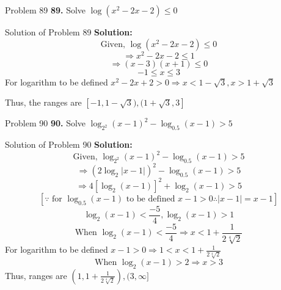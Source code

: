 \documentclass[aspectratio=169,8pt]{beamer}
\begin{document}
\begin{frame}{Problem 89}
  \textbf{89.} Solve $\log(x^2 - 2x - 2)\leq 0$
\end{frame}
\begin{frame}{Solution of Problem 89}
  \textbf{Solution:} $$\text{Given,~}\log(x^2 - 2x - 2)\leq 0$$
  $$\Rightarrow x^2 - 2x - 2 \leq 1$$
  $$\Rightarrow (x - 3)(x + 1)\leq 0$$
  $$-1 \leq x \leq 3$$
  For logarithm to be defined $x^2 - 2x + 2 > 0 \Rightarrow x < 1 - \sqrt{3}, x > 1 + \sqrt{3}$

  Thus, the ranges are $[-1, 1 - \sqrt{3}), (1 + \sqrt{3}, 3]$
\end{frame}
\begin{frame}{Problem 90}
  \textbf{90.} Solve $\log_{2^2}(x - 1)^2 - \log_{0.5}(x - 1)> 5$
\end{frame}
\begin{frame}{Solution of Problem 90}
  \textbf{Solution:} $$\text{Given,~}\log_{2^2}(x - 1)^2 - \log_{0.5}(x - 1)> 5$$
  $$\Rightarrow (2\log_2|x - 1|)^2 - \log_{0.5}(x - 1) > 5$$
  $$\Rightarrow 4[\log_2(x - 1)]^2 + \log_2(x - 1) > 5$$
  $$[\because \text{~for~}\log_{0.5}(x - 1) \text{~to be defined~} x- 1> 0 \therefore |x - 1| = x -1]$$
  $$\log_2(x - 1)< \frac{-5}{4}, \log_2(x - 1) > 1$$
  $$\text{When~}\log_2(x - 1)<\frac{-5}{4} \Rightarrow x < 1 + \frac{1}{2\sqrt[4]{2}}$$
  For logarithm to be defined $x - 1>0 \Rightarrow 1< x < 1 + \frac{1}{2\sqrt[4]{2}}$
  $$\text{When~}\log_2(x - 1)> 2 \Rightarrow x > 3$$
  Thus, ranges are $\left(1, 1 + \frac{1}{2\sqrt[4]{2}}\right), (3, \infty]$
\end{frame}
\end{document}
